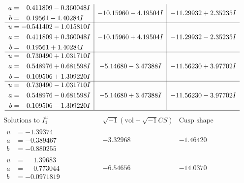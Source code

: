 \documentclass[1p]{elsarticle_modified}
\theoremstyle{definition}
\newcommand{\I}{\sqrt{-1}}
\begin{document}
$$\begin{array}{c|c|c}
\begin{aligned}
a &= \phantom{-}0.411809 - 0.360048 I \\
b &= \phantom{-}0.19561 - 1.40284 I\end{aligned}
 & -10.15960 - 4.19504 I & -11.29932 + 2.35235 I \\ \hline\begin{aligned}
u &= -0.541402 - 1.015810 I \\
a &= \phantom{-}0.411809 + 0.360048 I \\
b &= \phantom{-}0.19561 + 1.40284 I\end{aligned}
 & -10.15960 + 4.19504 I & -11.29932 - 2.35235 I \\ \hline\begin{aligned}
u &= \phantom{-}0.730490 + 1.031710 I \\
a &= \phantom{-}0.548976 + 0.681598 I \\
b &= -0.109506 + 1.309220 I\end{aligned}
 & -5.14680 - 3.47388 I & -11.56230 + 3.97702 I \\ \hline\begin{aligned}
u &= \phantom{-}0.730490 - 1.031710 I \\
a &= \phantom{-}0.548976 - 0.681598 I \\
b &= -0.109506 - 1.309220 I\end{aligned}
 & -5.14680 + 3.47388 I & -11.56230 - 3.97702 I\\
 \hline 
 \end{array}$$\newpage$$\begin{array}{c|c|c}  
\text{Solutions to }I^u_{1}& \I (\text{vol} + \sqrt{-1}CS) & \text{Cusp shape}\\
 \hline 
\begin{aligned}
u &= -1.39374\phantom{ +0.000000I} \\
a &= -0.389467\phantom{ +0.000000I} \\
b &= -0.880255\phantom{ +0.000000I}\end{aligned}
 & -3.32968\phantom{ +0.000000I} & -1.46420\phantom{ +0.000000I} \\ \hline\begin{aligned}
u &= \phantom{-}1.39683\phantom{ +0.000000I} \\
a &= \phantom{-}0.773044\phantom{ +0.000000I} \\
b &= -0.0971819\phantom{ +0.000000I}\end{aligned}
 & -6.54656\phantom{ +0.000000I} & -14.0370\phantom{ +0.000000I} \\ \hline\begin{aligned}

\end{aligned}
\end{array}$$
\end{document}
